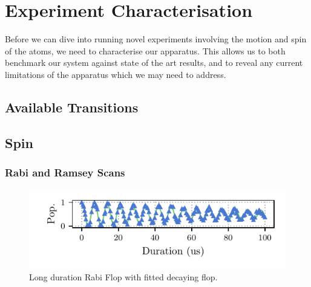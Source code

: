 \documentclass[12pt]{report}
\begin{document}

\chapter{Experiment Characterisation}

    Before we can dive into running novel experiments involving the motion and spin
    of the atoms, we need to characterise our apparatus. This allows us to both
    benchmark our system against state of the art results, and to reveal any
    current limitations of the apparatus which we may need to address.

\section{Available Transitions}
\label{sec:Transitions}

\section{Spin}
\label{sec:Spin}

\subsection{Rabi and Ramsey Scans}

    \begin{figure}
        \begin{center}
        \noindent\includegraphics[width=\linewidth]{
            figures/pdf_figure/long_flop.pdf
            }
        \end{center}
        \caption{Long duration Rabi Flop with fitted decaying flop.
            }
        \label{fig:Long Flop}
    \end{figure}
\end{document}
